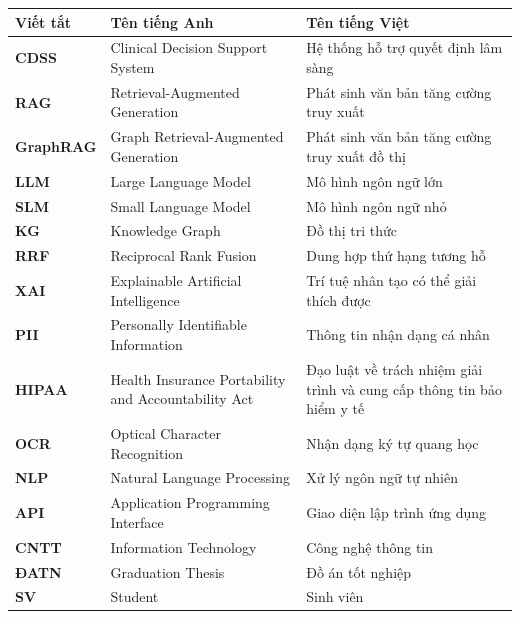\documentclass[../main.tex]{subfiles}
\begin{document}
\begin{longtable}{l p{6cm} p{7cm}}
	\hline
   \textbf{Viết tắt}  & \textbf{Tên tiếng Anh}	& \textbf{Tên tiếng Việt} \\ \hline 
	\textbf{CDSS} & Clinical Decision Support System & Hệ thống hỗ trợ quyết định lâm sàng\\
	\textbf{RAG} & Retrieval-Augmented Generation & Phát sinh văn bản tăng cường truy xuất\\
	\textbf{GraphRAG} & Graph Retrieval-Augmented Generation & Phát sinh văn bản tăng cường truy xuất đồ thị\\
	\textbf{LLM} & Large Language Model & Mô hình ngôn ngữ lớn\\
	\textbf{SLM} & Small Language Model & Mô hình ngôn ngữ nhỏ\\
	\textbf{KG} & Knowledge Graph & Đồ thị tri thức\\
	\textbf{RRF} & Reciprocal Rank Fusion & Dung hợp thứ hạng tương hỗ\\
	\textbf{XAI} & Explainable Artificial Intelligence & Trí tuệ nhân tạo có thể giải thích được\\
	\textbf{PII} & Personally Identifiable Information & Thông tin nhận dạng cá nhân\\
	\textbf{HIPAA} & Health Insurance Portability and Accountability Act & Đạo luật về trách nhiệm giải trình và cung cấp thông tin bảo hiểm y tế\\
	\textbf{OCR} & Optical Character Recognition & Nhận dạng ký tự quang học\\
	\textbf{NLP} & Natural Language Processing & Xử lý ngôn ngữ tự nhiên\\
	\textbf{API} & Application Programming Interface & Giao diện lập trình ứng dụng\\
	\textbf{CNTT} & Information Technology & Công nghệ thông tin\\
	\textbf{ĐATN} & Graduation Thesis & Đồ án tốt nghiệp \\
	\textbf{SV} & Student & Sinh viên \\

    \hline
\end{longtable}
\end{document}

